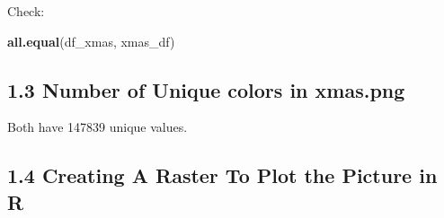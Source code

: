 \documentclass[]{article}
\newenvironment{Shaded}{\begin{snugshade}}{\end{snugshade}}
\newcommand{\DataTypeTok}[1]{\textcolor[rgb]{0.13,0.29,0.53}{#1}}
\newcommand{\KeywordTok}[1]{\textcolor[rgb]{0.13,0.29,0.53}{\textbf{#1}}}
\newcommand{\NormalTok}[1]{#1}
\newcommand{\OperatorTok}[1]{\textcolor[rgb]{0.81,0.36,0.00}{\textbf{#1}}}
\newcommand{\StringTok}[1]{\textcolor[rgb]{0.31,0.60,0.02}{#1}}
\begin{document}
Check:

\begin{Shaded}
\begin{Highlighting}[]
\KeywordTok{all.equal}\NormalTok{(df_xmas, xmas_df)}
\end{Highlighting}
\end{Shaded}

\hypertarget{number-of-unique-colors-in-xmas.png}{%
\subsection{1.3 Number of Unique colors in
xmas.png}\label{number-of-unique-colors-in-xmas.png}}

\begin{Shaded}
\end{Shaded}

\begin{Shaded}
\end{Shaded}

Both have 147839 unique values.

\hypertarget{creating-a-raster-to-plot-the-picture-in-r}{%
\subsection{1.4 Creating A Raster To Plot the Picture in
R}\label{creating-a-raster-to-plot-the-picture-in-r}}

\begin{Shaded}
\end{Shaded}
\end{document}
